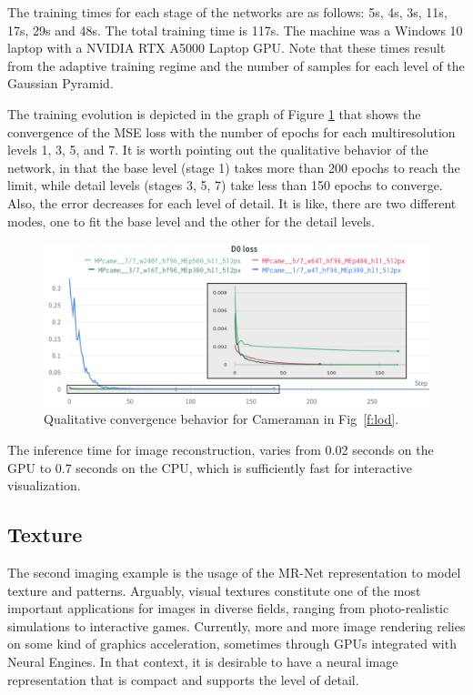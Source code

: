 The training times for each stage of the networks are as follows: 5s, 4s, 3s, 11s, 17s, 29s and 48s. The total training time is 117s. The machine was a Windows 10 laptop with a NVIDIA RTX A5000 Laptop GPU. Note that these times result from the adaptive training regime and the number of samples for each level of the Gaussian Pyramid. 

The training evolution is depicted in the graph of Figure \ref{f:training-epochs} that shows the convergence of the MSE loss with the number of epochs for each multiresolution levels 1, 3, 5, and 7. It is worth pointing out the qualitative behavior of the network, in that the base level (stage 1) takes more than 200 epochs to reach the limit, while detail levels (stages 3, 5, 7) take less than 150 epochs to converge. Also, the error decreases for each level of detail. It is like, there are two different modes, one to fit the base level and the other for the detail levels.

\begin{figure}[!h]
\centering
\includegraphics[width=\linewidth]{img/ch5/stages-training-epochs.png}
\caption{Qualitative convergence behavior for Cameraman in Fig~\ref{f:lod}.}
\label{f:training-epochs}
\end{figure}


The inference time for image reconstruction, varies from 0.02 seconds on the GPU to 0.7 seconds on the CPU, which is sufficiently fast for interactive visualization.

\subsection{Texture}

The second imaging example is the usage of the MR-Net representation to model texture and patterns. Arguably, visual textures constitute one of the most important applications for images in diverse fields, ranging from photo-realistic simulations to interactive games. Currently, more and more image rendering relies on some kind of graphics acceleration, sometimes through GPUs integrated with Neural Engines. In that context, it is desirable to have a neural image representation that is compact and supports the level of detail.

